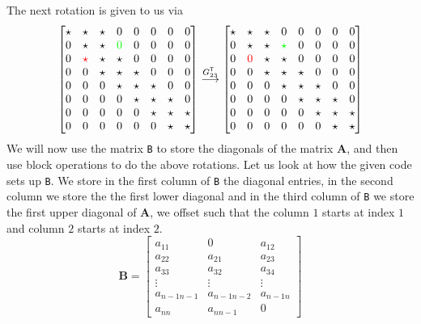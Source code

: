 \documentclass{article}
\begin{document}
The next rotation is given to us via
\begin{equation*}
    \begin{bmatrix}
    \star & \star & \star  & 0 & 0 & 0 & 0 & 0 \\
        0& \star & \star & \color{green} 0 \color{black}& 0 & 0 & 0 & 0 \\
        0 & \color{red}\star \color{black} & \star & \star & 0 & 0 & 0 & 0 \\
        0 & 0 & \star & \star & \star & 0 & 0 & 0 \\
         0 & 0 & 0 & \star & \star & \star & 0  & 0 \\
         0 & 0 & 0 & 0 & \star & \star & \star & 0\\
         0 & 0 & 0 & 0 & 0 & \star& \star & \star \\
         0 & 0 & 0 & 0 & 0 & 0& \star & \star \\
    \end{bmatrix} \overset{G_{23}^{\mathsf{T}}}{\longrightarrow}\begin{bmatrix}
    \star & \star & \star  & 0 & 0 & 0 & 0 & 0 \\
        0& \star & \star & \color{green} \star \color{black}& 0 & 0 & 0 & 0 \\
        0 & \color{red}0 \color{black} & \star & \star & 0 & 0 & 0 & 0 \\
        0 & 0 & \star & \star & \star & 0 & 0 & 0 \\
         0 & 0 & 0 & \star & \star & \star & 0  & 0 \\
         0 & 0 & 0 & 0 & \star & \star & \star & 0\\
         0 & 0 & 0 & 0 & 0 & \star& \star & \star \\
         0 & 0 & 0 & 0 & 0 & 0& \star & \star \\
    \end{bmatrix}
\end{equation*}
We will now use the matrix \verb|B| to store the diagonals of the matrix $\mathbf{A}$, and then use block operations to do the above rotations. Let us look at how the given code sets up \verb|B|. We store in the first column of \verb|B| the diagonal entries, in the second column we store the the first lower diagonal and in the third column of \verb|B| we store the first upper diagonal of $\mathbf{A}$, we offset such that the column $1$ starts at index $1$ and column $2$ starts at index $2$.
\begin{equation*}
\mathbf{B} = 
    \begin{bmatrix}
        a_{11} & 0 & a_{12} \\
        a_{22} & a_{21} & a_{23} \\
        a_{33} & a_{32} & a_{34} \\
        \vdots & \vdots & \vdots \\
        a_{n-1n-1} & a_{n-1n-2} & a_{n-1n} \\
        a_{nn} & a_{nn-1} & 0
    \end{bmatrix}
\end{equation*}
\end{document}
